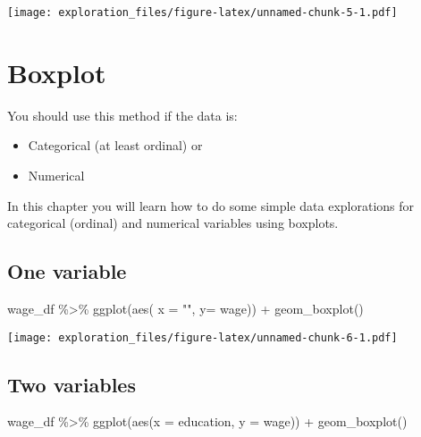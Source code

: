 \documentclass[
]{book}
\newenvironment{Shaded}{\begin{snugshade}}{\end{snugshade}}
\newcommand{\AttributeTok}[1]{\textcolor[rgb]{0.77,0.63,0.00}{#1}}
\newcommand{\FunctionTok}[1]{\textcolor[rgb]{0.00,0.00,0.00}{#1}}
\newcommand{\NormalTok}[1]{#1}
\newcommand{\SpecialCharTok}[1]{\textcolor[rgb]{0.00,0.00,0.00}{#1}}
\newcommand{\StringTok}[1]{\textcolor[rgb]{0.31,0.60,0.02}{#1}}
\providecommand{\tightlist}{%
  \setlength{\itemsep}{0pt}\setlength{\parskip}{0pt}}
\begin{document}
\texttt{[image: exploration\_files/figure-latex/unnamed-chunk-5-1.pdf]}

\hypertarget{boxplot}{%
\chapter{Boxplot}\label{boxplot}}

You should use this method if the data is:

\begin{itemize}
\tightlist
\item
  Categorical (at least ordinal) or
\item
  Numerical
\end{itemize}

In this chapter you will learn how to do some simple data explorations for categorical (ordinal) and numerical variables using boxplots.

\hypertarget{one-variable-3}{%
\section{One variable}\label{one-variable-3}}

\begin{Shaded}
\begin{Highlighting}[]
\NormalTok{wage\_df }\SpecialCharTok{\%\textgreater{}\%} 
  \FunctionTok{ggplot}\NormalTok{(}\FunctionTok{aes}\NormalTok{( }\AttributeTok{x =} \StringTok{""}\NormalTok{, }\AttributeTok{y=}\NormalTok{ wage)) }\SpecialCharTok{+} 
  \FunctionTok{geom\_boxplot}\NormalTok{() }
\end{Highlighting}
\end{Shaded}

\texttt{[image: exploration\_files/figure-latex/unnamed-chunk-6-1.pdf]}

\hypertarget{two-variables-3}{%
\section{Two variables}\label{two-variables-3}}

\begin{Shaded}
\begin{Highlighting}[]
\NormalTok{wage\_df }\SpecialCharTok{\%\textgreater{}\%} 
  \FunctionTok{ggplot}\NormalTok{(}\FunctionTok{aes}\NormalTok{(}\AttributeTok{x =}\NormalTok{ education, }\AttributeTok{y =}\NormalTok{ wage)) }\SpecialCharTok{+} 
  \FunctionTok{geom\_boxplot}\NormalTok{()}
\end{Highlighting}
\end{Shaded}
\end{document}
